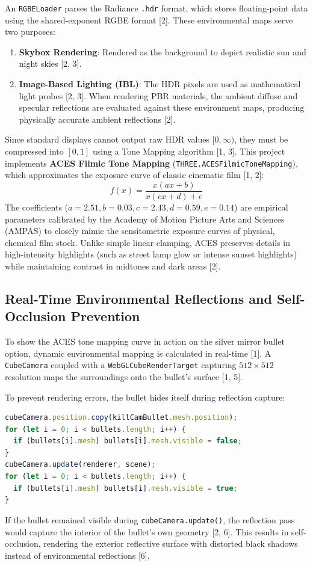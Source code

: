\documentclass[11pt,a4paper,oneside]{article}
\begin{document}
An \texttt{RGBELoader} parses the Radiance \texttt{.hdr} format, which stores floating-point data using the shared-exponent RGBE format [2]. These environmental maps serve two purposes:
\begin{enumerate}
    \item \textbf{Skybox Rendering}: Rendered as the background to depict realistic sun and night skies [2, 3].
    \item \textbf{Image-Based Lighting (IBL)}: The HDR pixels are used as mathematical light probes [2, 3]. When rendering PBR materials, the ambient diffuse and specular reflections are evaluated against these environment maps, producing physically accurate ambient reflections [2].
\end{enumerate}

Since standard displays cannot output raw HDR values $[0, \infty)$, they must be compressed into $[0, 1]$ using a Tone Mapping algorithm [1, 3]. This project implements \textbf{ACES Filmic Tone Mapping} (\texttt{THREE.ACESFilmicToneMapping}), which approximates the exposure curve of classic cinematic film [1, 2]:
\begin{equation}
    f(x) = \frac{x(ax + b)}{x(cx + d) + e}
\end{equation}
The coefficients ($a = 2.51, b = 0.03, c = 2.43, d = 0.59, e = 0.14$) are empirical parameters calibrated by the Academy of Motion Picture Arts and Sciences (AMPAS) to closely mimic the sensitometric exposure curves of physical, chemical film stock. Unlike simple linear clamping, ACES preserves details in high-intensity highlights (such as street lamp glow or intense sunset highlights) while maintaining contrast in midtones and dark areas [2].

\subsection{Real-Time Environmental Reflections and Self-Occlusion Prevention}
To show the ACES tone mapping curve in action on the silver mirror bullet option, dynamic environmental mapping is calculated in real-time [1]. A \texttt{CubeCamera} coupled with a \texttt{WebGLCubeRenderTarget} capturing $512 \times 512$ resolution maps the surroundings onto the bullet's surface [1, 5].

To prevent rendering errors, the bullet hides itself during reflection capture:
\begin{lstlisting}[language=JavaScript, caption={Dynamic cube-map generation}]
cubeCamera.position.copy(killCamBullet.mesh.position);
for (let i = 0; i < bullets.length; i++) {
  if (bullets[i].mesh) bullets[i].mesh.visible = false;
}
cubeCamera.update(renderer, scene);
for (let i = 0; i < bullets.length; i++) {
  if (bullets[i].mesh) bullets[i].mesh.visible = true;
}
\end{lstlisting}
If the bullet remained visible during \texttt{cubeCamera.update()}, the reflection pass would capture the interior of the bullet's own geometry [2, 6]. This results in self-occlusion, rendering the exterior reflective surface with distorted black shadows instead of environmental reflections [6].
\end{document}
